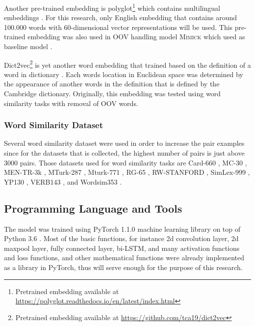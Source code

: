             Another pre-trained embedding is
            polyglot\footnote{Pretrained embedding available at
            \url{https://polyglot.readthedocs.io/en/latest/index.html}}
             which contains multilingual embeddings
            \citep{polyglot2013alrfou}. For this research, only
            English embedding that contains around 100.000 words with
            60-dimensional vector representations will be used. This
            pre-trained embedding was also used in OOV handling model
            \textsc{Mimick} which used as baseline model
            \citep{mimicking2017Pinter}.

            Dict2vec\footnote{Pretrained embedding available at
            \url{https://github.com/tca19/dict2vec}} is yet another word
            embedding that trained based on the definition of a word in
            dictionary \citep{dict2vect2017tissier}. Each words
            location in Euclidean space was determined by the
            appearance of another words in the definition that is
            defined by the Cambridge dictionary. Originally, this
            embedding was tested using word similarity tasks with
            removal of OOV words.

        \subsubsection{Word Similarity Dataset}
            Several word similarity dataset were used in order to
            increase the pair examples since for the datasets that is
            collected, the highest number of pairs is just above 3000
            pairs. Those datasets used for word similarity tasks are
            Card-660 \citep{card660:pilehvar-etal:2018}, MC-30
            \citep{mc30:strongContextualHypothesis}, MEN-TR-3k
            \citep{mentr3k:bruni-etal-2012-distributional}, MTurk-287
            \citep{mturk287:Radinsky:2011:WTC:1963405.1963455},
            Mturk-771
            \citep{mturk771:Halawi:2012:LLW:2339530.2339751}, RG-65
            \citep{rg65:Rubenstein:1965:CCS:365628.365657},
            RW-STANFORD \citep{rw:luong-etal-2013-better}, SimLex-999
            \citep{simlex999:hill2014}, YP130
            \citep{yp130:inproceedings}, VERB143
            \citep{vp143:baker-etal-2014-unsupervised}, and Wordsim353
            \citep{wordsim353:2002:PSC:503104.503110}.

    \subsection{Programming Language and Tools}
        The model was trained using PyTorch 1.1.0 machine learning
        library on top of Python 3.6 \citep{pytorch2017paszke}. Most
        of the basic functions, for instance 2d convolution layer, 2d
        maxpool layer, fully connected layer, bi-LSTM, and many
        activation functions and loss functions, and other mathematical
        functions were already implemented as a library in PyTorch,
        thus will serve enough for the purpose of this research.
            
